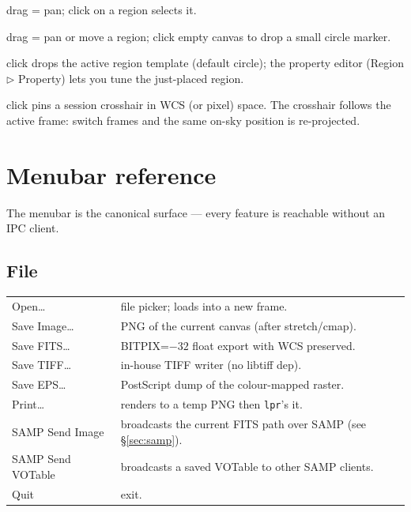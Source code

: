 \documentclass[11pt,a4paper]{article}
\begin{document}
\begin{description}[font=\sffamily\bfseries\color{accent}]
\item[pan]       drag = pan; click on a region selects it.
\item[edit]      drag = pan or move a region; click empty canvas to drop a
                 small circle marker.
\item[region]    click drops the active region template (default circle);
                 the property editor (Region $\triangleright$ Property)
                 lets you tune the just-placed region.
\item[crosshair] click pins a session crosshair in WCS (or pixel) space.
                 The crosshair follows the active frame: switch frames and
                 the same on-sky position is re-projected.
\end{description}

\section{Menubar reference}

The menubar is the canonical surface --- every feature is reachable
without an IPC client.

\subsection{File}

\begin{tabular}{@{}>{\sffamily}lp{}@{}}
\toprule
Open\dots         & file picker; loads into a new frame. \\
Save Image\dots   & PNG of the current canvas (after stretch/cmap). \\
Save FITS\dots    & BITPIX=$-32$ float export with WCS preserved. \\
Save TIFF\dots    & in-house TIFF writer (no libtiff dep). \\
Save EPS\dots     & PostScript dump of the colour-mapped raster. \\
Print\dots        & renders to a temp PNG then \texttt{lpr}'s it. \\
SAMP Send Image   & broadcasts the current FITS path over SAMP (see \S\ref{sec:samp}). \\
SAMP Send VOTable & broadcasts a saved VOTable to other SAMP clients. \\
Quit              & exit. \\
\bottomrule
\end{tabular}
\end{document}
